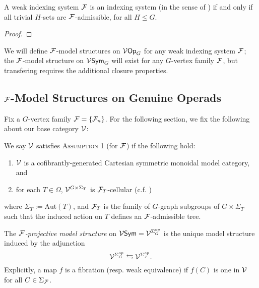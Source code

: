 \documentclass[a4paper,10pt]{article}%
\begin{document}
\begin{lemma}
  A weak indexing system $\mathcal F$ is an indexing system (in the sense of \cite{BH15}) if and only if all trivial $H$-sets are $\mathcal F$-admissible, for all $H\leq G$.
\end{lemma}
\begin{proof}
\end{proof}

We will define $\mathcal F$-model structures on $\mathcal V\mathsf{Op}_G$ for any weak indexing system $\mathcal F$; the $\mathcal F$-model structure on $\mathcal V\mathsf{Sym}_G$ will exist for any $G$-vertex family $\mathcal F$, but transfering requires the additional closure properties.

\subsection{$\mathcal F$-Model Structures on Genuine Operads}

Fix a $G$-vertex family $\mathcal F = \left\{\mathcal F_n\right\}$. For the following section, we fix the following about our base category $\mathcal V$:
\begin{definition}
  We say $\mathcal V$ satisfies \textsc{Assumption 1} (for $\mathcal F$) if the following hold:
  \begin{enumerate}
  \item $\mathcal V$ is a cofibrantly-generated Cartesian symmetric monoidal model category, and
  \item for each $T\in\Omega$, $\mathcal V^{G\times \Sigma_T}$ is $\mathcal F_T$-cellular (c.f. \cite{Stephan16})
  \end{enumerate}
where $\Sigma_T := \mathrm{Aut}(T)$, and $\mathcal F_T$ is the family of $G$-graph subgroups of $G\times \Sigma_T$ such that the induced action on $T$ defines an $\mathcal F$-admissible tree.
\end{definition}

\begin{definition}
  The \textit{$\mathcal F$-projective model structure} on $\mathcal V\mathsf{Sym} = \mathcal V^{\Sigma_G^{op}}$ is the unique model structure induced by the adjunction
\[
\mathcal V^{\Sigma_G^{op}} \leftrightarrows \mathcal V^{\Sigma_{\mathcal F}^{op}}.
\]
Explicitly, a map $f$ is a fibration (resp. weak equivalence) if $f(C)$ is one in $\mathcal V$ for all $C\in \Sigma_{\mathcal F}$.
\end{definition}
\end{document}
